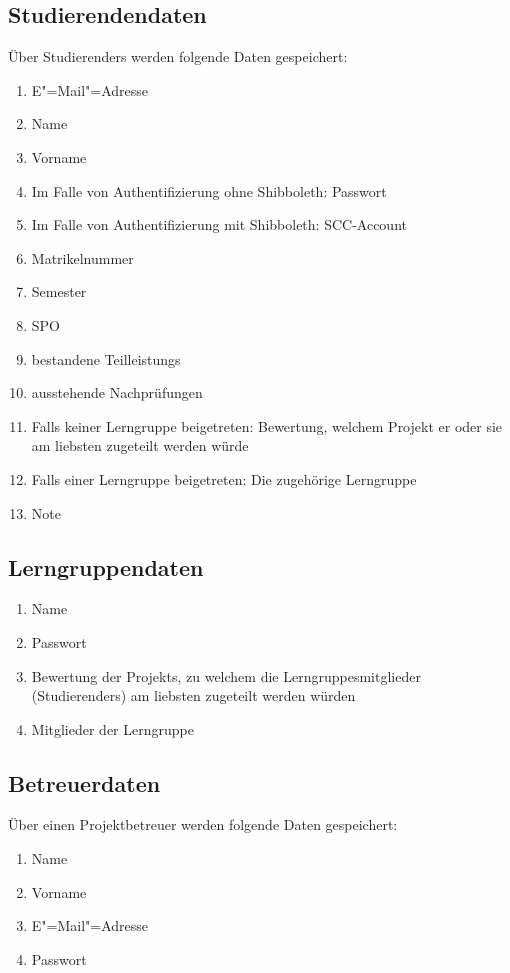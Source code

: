 \documentclass[parskip=full]{scrartcl}
\newcommand{\swtLabel}[1]{\textbf{/#1\arabic*0/}}
\begin{document}
\subsection{Studierendendaten} 
Über \glspl{Studierender} werden folgende Daten gespeichert:
\begin{enumerate}[label=\swtLabel{D}, resume] 
  \item E"=Mail"=Adresse \label{SDatenAnfang}
  \item Name
  \item Vorname
  \item Im Falle von Authentifizierung ohne \gls{Shibboleth}: Passwort
  \item Im Falle von Authentifizierung mit \gls{Shibboleth}: \gls{SCC-Account}
  \item \gls{Matrikelnummer}
  \item Semester
  \item \gls{SPO}
  \item bestandene \glspl{Teilleistung} 
  \item ausstehende Nachprüfungen \label{SDatenEnde}
  
  \item Falls keiner \gls{Lerngruppe} beigetreten: \gls{Bewertung}, welchem \gls{Projekt} er oder
  sie am liebsten zugeteilt werden würde
  \item Falls einer \gls{Lerngruppe} beigetreten: Die zugehörige
  \gls{Lerngruppe}
  \item Note
\end{enumerate}
\subsection{Lerngruppendaten} 
\begin{enumerate}[label=\swtLabel{D}, resume] 
  \item Name
  \item Passwort
  \item \gls{Bewertung} der \glspl{Projekt}, zu welchem die \glspl{Lerngruppe}mitglieder
  (\glspl{Studierender}) am liebsten zugeteilt werden würden
  \item Mitglieder der \gls{Lerngruppe}
\end{enumerate}


\subsection{Betreuerdaten}
Über einen \gls{Projektbetreuer} werden folgende Daten gespeichert:
\begin{enumerate}[label=\swtLabel{D}, resume] 
	\item Name \label{DbetAnfang}
	\item Vorname
	\item E"=Mail"=Adresse
	\item Passwort \label{DbetEnde}
\end{enumerate}
\end{document}
